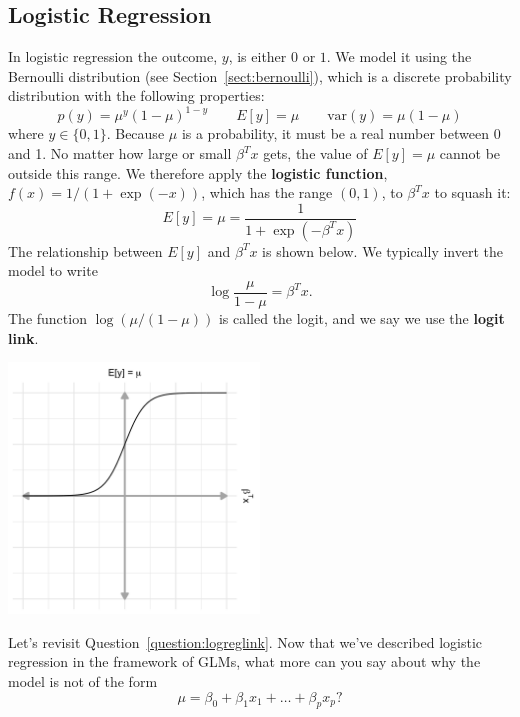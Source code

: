 \subsection{Logistic Regression}

In logistic regression the outcome, $y$, is either $0$ or $1$. We model it using the Bernoulli distribution (see Section~\ref{sect:bernoulli}), which is a discrete probability distribution with the following properties:
$$ p(y) = \mu^y (1 - \mu) ^ {1-y} \qquad E[y] = \mu \qquad \text{var}(y) = \mu (1 - \mu) $$
where $y \in \{0, 1\}$. Because $\mu$ is a probability, it must be a real number between 0 and 1. No matter how large or small $\beta^T x$ gets, the value of $E[y] = \mu$ cannot be outside this range. We therefore apply the \textbf{logistic function}, $f(x) = 1/(1 + \exp(-x))$, which has the range $(0, 1)$, to $\beta^T x$ to squash it:
\begin{equation} E[y] = \mu = \frac{1}{1 + \exp{(-\beta^Tx)}} \label{eqn:meanlogistic} \end{equation}
The relationship between $E[y]$ and $\beta^T x$ is shown below. We typically invert the model to write
$$ \log{\frac{\mu}{1-\mu}} = \beta^T x. $$
The function $\log \left( \mu/(1-\mu) \right)$ is called the logit, and we say we use the \textbf{logit link}.

\begin{center}
\includegraphics[width=0.5\textwidth]{img/l02-figure2-logistic.png}
\end{center}

\vspace{3mm}

\begin{question}{}
Let's revisit Question~\ref{question:logreglink}. Now that we've described logistic regression in the framework of GLMs, what more can you say about why the model is not of the form
$$ \mu = \beta_0 + \beta_1 x_1 + \dots + \beta_p x_p \text{?}$$
\end{question}

